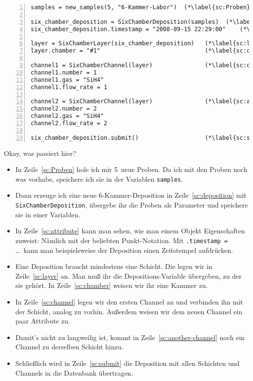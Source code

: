 \documentclass[german,11pt]{article}
\begin{document}
\begin{lstlisting}[numbers=left]
samples = new_samples(5, "6-Kammer-Labor")  (*\label{sc:Proben}*)

six_chamber_deposition = SixChamberDeposition(samples)  (*\label{sc:deposition}*)
six_chamber_deposition.timestamp = "2008-09-15 22:29:00"    (*\label{sc:attribute}*)

layer = SixChamberLayer(six_chamber_deposition)   (*\label{sc:layer}*)
layer.chamber = "#1"                              (*\label{sc:chamber}*)

channel1 = SixChamberChannel(layer)               (*\label{sc:channel}*)
channel1.number = 1
channel1.gas = "SiH4"
channel1.flow_rate = 1

channel2 = SixChamberChannel(layer)               (*\label{sc:another-channel}*)
channel2.number = 2
channel2.gas = "SiH4"
channel2.flow_rate = 2

six_chamber_deposition.submit()                   (*\label{sc:submit}*)
\end{lstlisting}

Okay, was passiert hier?\bigskip

\begin{itemize}
\item In Zeile~\ref{sc:Proben} hole ich mir 5~neue Proben.  Da ich mit den
  Proben noch was vorhabe, speichere ich sie in der Variablen
  \lstinline|samples|.
\item Dann erzeuge ich eine neue 6-Kammer-Deposition in
  Zeile~\ref{sc:deposition} mit \lstinline|SixChamberDeposition|, übergebe ihr
  die Proben als Parameter und speichere sie in einer Variablen.
\item In Zeile~\ref{sc:attribute} kann man sehen, wie man einem Objekt
  Eigenschaften zuweist: Nämlich mit der beliebten Punkt-Notation.  Mit
  \lstinline|.timestamp = |…\ kann man beispielsweise der Deposition einen
  Zeitstempel aufdrücken.
\item Eine Deposition braucht mindestens eine Schicht.  Die legen wir in
  Zeile~\ref{sc:layer} an.  Man muß ihr die Depositions-Variable übergeben, zu
  der sie gehört.  In Zeile~\ref{sc:chamber} weisen wir ihr eine Kammer zu.
\item In Zeile~\ref{sc:channel} legen wir den ersten Channel an und verbinden
  ihn mit der Schicht, analog zu vorhin.  Außerdem weisen wir dem neuen Channel
  ein paar Attribute zu.
\item Damit's nicht zu langweilig ist, kommt in Zeile~\ref{sc:another-channel}
  noch ein Channel zu derselben Schicht hinzu.
\item Schließlich wird in Zeile~\ref{sc:submit} die Deposition mit allen
  Schichten und Channels in die Datenbank übertragen. 
\end{itemize}
\end{document}
